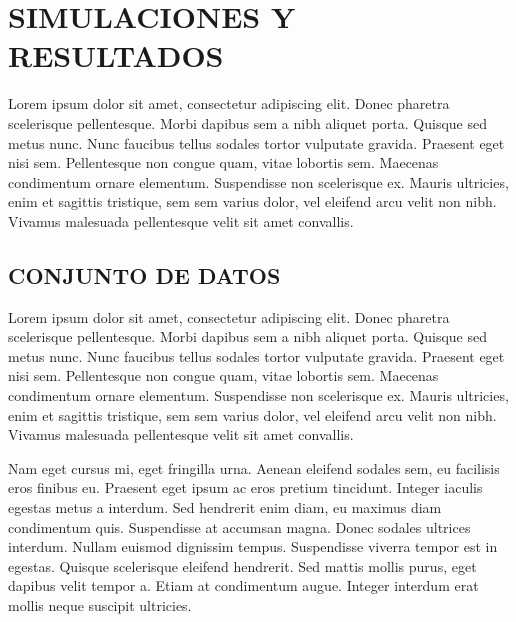 
\chapter{SIMULACIONES Y RESULTADOS}

Lorem ipsum dolor sit amet, consectetur adipiscing elit. Donec pharetra scelerisque pellentesque. Morbi dapibus sem a nibh aliquet porta. Quisque sed metus nunc. Nunc faucibus tellus sodales tortor vulputate gravida. Praesent eget nisi sem. Pellentesque non congue quam, vitae lobortis sem. Maecenas condimentum ornare elementum. Suspendisse non scelerisque ex. Mauris ultricies, enim et sagittis tristique, sem sem varius dolor, vel eleifend arcu velit non nibh. Vivamus malesuada pellentesque velit sit amet convallis.


\section{CONJUNTO DE DATOS}
Lorem ipsum dolor sit amet, consectetur adipiscing elit. Donec pharetra scelerisque pellentesque. Morbi dapibus sem a nibh aliquet porta. Quisque sed metus nunc. Nunc faucibus tellus sodales tortor vulputate gravida. Praesent eget nisi sem. Pellentesque non congue quam, vitae lobortis sem. Maecenas condimentum ornare elementum. Suspendisse non scelerisque ex. Mauris ultricies, enim et sagittis tristique, sem sem varius dolor, vel eleifend arcu velit non nibh. Vivamus malesuada pellentesque velit sit amet convallis.

Nam eget cursus mi, eget fringilla urna. Aenean eleifend sodales sem, eu facilisis eros finibus eu. Praesent eget ipsum ac eros pretium tincidunt. Integer iaculis egestas metus a interdum. Sed hendrerit enim diam, eu maximus diam condimentum quis. Suspendisse at accumsan magna. Donec sodales ultrices interdum. Nullam euismod dignissim tempus. Suspendisse viverra tempor est in egestas. Quisque scelerisque eleifend hendrerit. Sed mattis mollis purus, eget dapibus velit tempor a. Etiam at condimentum augue. Integer interdum erat mollis neque suscipit ultricies.


